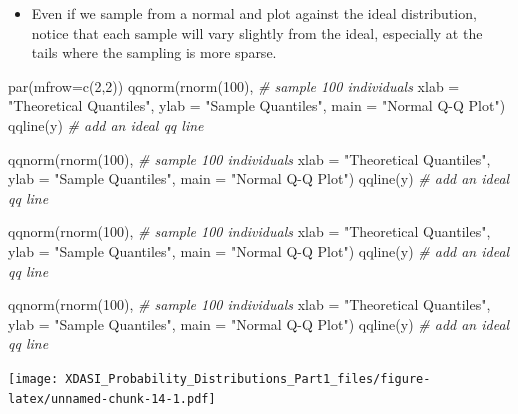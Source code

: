 \documentclass[
]{article}
\newenvironment{Shaded}{\begin{snugshade}}{\end{snugshade}}
\newcommand{\AttributeTok}[1]{\textcolor[rgb]{0.77,0.63,0.00}{#1}}
\newcommand{\CommentTok}[1]{\textcolor[rgb]{0.56,0.35,0.01}{\textit{#1}}}
\newcommand{\DecValTok}[1]{\textcolor[rgb]{0.00,0.00,0.81}{#1}}
\newcommand{\FunctionTok}[1]{\textcolor[rgb]{0.00,0.00,0.00}{#1}}
\newcommand{\NormalTok}[1]{#1}
\newcommand{\StringTok}[1]{\textcolor[rgb]{0.31,0.60,0.02}{#1}}
\providecommand{\tightlist}{%
  \setlength{\itemsep}{0pt}\setlength{\parskip}{0pt}}
\begin{document}
\begin{itemize}
\tightlist
\item
  Even if we sample from a normal and plot against the ideal
  distribution, notice that each sample will vary slightly from the
  ideal, especially at the tails where the sampling is more sparse.
\end{itemize}

\begin{Shaded}
\begin{Highlighting}[]
\FunctionTok{par}\NormalTok{(}\AttributeTok{mfrow=}\FunctionTok{c}\NormalTok{(}\DecValTok{2}\NormalTok{,}\DecValTok{2}\NormalTok{))}
\FunctionTok{qqnorm}\NormalTok{(}\FunctionTok{rnorm}\NormalTok{(}\DecValTok{100}\NormalTok{),  }\CommentTok{\# sample 100 individuals}
       \AttributeTok{xlab =} \StringTok{"Theoretical Quantiles"}\NormalTok{, }
       \AttributeTok{ylab =} \StringTok{"Sample Quantiles"}\NormalTok{,}
       \AttributeTok{main =} \StringTok{"Normal Q{-}Q Plot"}\NormalTok{)}
\FunctionTok{qqline}\NormalTok{(y)           }\CommentTok{\# add an ideal qq line}

\FunctionTok{qqnorm}\NormalTok{(}\FunctionTok{rnorm}\NormalTok{(}\DecValTok{100}\NormalTok{),  }\CommentTok{\# sample 100 individuals}
       \AttributeTok{xlab =} \StringTok{"Theoretical Quantiles"}\NormalTok{, }
       \AttributeTok{ylab =} \StringTok{"Sample Quantiles"}\NormalTok{,}
       \AttributeTok{main =} \StringTok{"Normal Q{-}Q Plot"}\NormalTok{)}
\FunctionTok{qqline}\NormalTok{(y)           }\CommentTok{\# add an ideal qq line}

\FunctionTok{qqnorm}\NormalTok{(}\FunctionTok{rnorm}\NormalTok{(}\DecValTok{100}\NormalTok{),  }\CommentTok{\# sample 100 individuals}
       \AttributeTok{xlab =} \StringTok{"Theoretical Quantiles"}\NormalTok{, }
       \AttributeTok{ylab =} \StringTok{"Sample Quantiles"}\NormalTok{,}
       \AttributeTok{main =} \StringTok{"Normal Q{-}Q Plot"}\NormalTok{)}
\FunctionTok{qqline}\NormalTok{(y)           }\CommentTok{\# add an ideal qq line}

\FunctionTok{qqnorm}\NormalTok{(}\FunctionTok{rnorm}\NormalTok{(}\DecValTok{100}\NormalTok{),  }\CommentTok{\# sample 100 individuals}
       \AttributeTok{xlab =} \StringTok{"Theoretical Quantiles"}\NormalTok{, }
       \AttributeTok{ylab =} \StringTok{"Sample Quantiles"}\NormalTok{,}
       \AttributeTok{main =} \StringTok{"Normal Q{-}Q Plot"}\NormalTok{)}
\FunctionTok{qqline}\NormalTok{(y)           }\CommentTok{\# add an ideal qq line}
\end{Highlighting}
\end{Shaded}

\texttt{[image: XDASI\_Probability\_Distributions\_Part1\_files/figure-latex/unnamed-chunk-14-1.pdf]}
\end{document}
